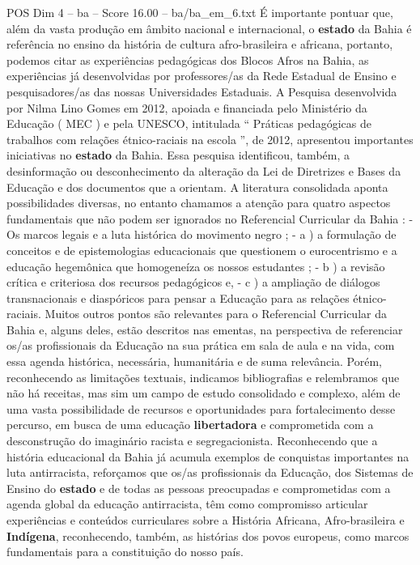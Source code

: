 \begin{textsample}{POS Dim 4 – ba – Score 16.00 – ba/ba\_em\_6.txt}
É importante pontuar que, além da vasta produção em âmbito nacional e internacional, o \textbf{estado} da Bahia é referência no ensino da história de cultura afro-brasileira e africana, portanto, podemos citar as experiências pedagógicas dos Blocos Afros na Bahia, as experiências já desenvolvidas por professores/as da Rede Estadual de Ensino e pesquisadores/as das nossas Universidades Estaduais.
A Pesquisa desenvolvida por Nilma Lino Gomes em 2012, apoiada e financiada pelo Ministério da Educação ( MEC ) e pela UNESCO, intitulada “ Práticas pedagógicas de trabalhos com relações étnico-raciais na escola ”, de 2012, apresentou importantes iniciativas no \textbf{estado} da Bahia.
Essa pesquisa identificou, também, a desinformação ou desconhecimento da alteração da Lei de Diretrizes e Bases da Educação e dos documentos que a orientam.
A literatura consolidada aponta possibilidades diversas, no entanto chamamos a atenção para quatro aspectos fundamentais que não podem ser ignorados no Referencial Curricular da Bahia : - Os marcos legais e a luta histórica do movimento negro ; - a ) a formulação de conceitos e de epistemologias educacionais que questionem o eurocentrismo e a educação hegemônica que homogeneíza os nossos estudantes ; - b ) a revisão crítica e criteriosa dos recursos pedagógicos e, - c ) a ampliação de diálogos transnacionais e diaspóricos para pensar a Educação para as relações étnico-raciais.
Muitos outros pontos são relevantes para o Referencial Curricular da Bahia e, alguns deles, estão descritos nas ementas, na perspectiva de referenciar os/as profissionais da Educação na sua prática em sala de aula e na vida, com essa agenda histórica, necessária, humanitária e de suma relevância.
Porém, reconhecendo as limitações textuais, indicamos bibliografias e relembramos que não há receitas, mas sim um campo de estudo consolidado e complexo, além de uma vasta possibilidade de recursos e oportunidades para fortalecimento desse percurso, em busca de uma educação \textbf{libertadora} e comprometida com a desconstrução do imaginário racista e segregacionista.
Reconhecendo que a história educacional da Bahia já acumula exemplos de conquistas importantes na luta antirracista, reforçamos que os/as profissionais da Educação, dos Sistemas de Ensino do \textbf{estado} e de todas as pessoas preocupadas e comprometidas com a agenda global da educação antirracista, têm como compromisso articular experiências e conteúdos curriculares sobre a História Africana, Afro-brasileira e \textbf{Indígena}, reconhecendo, também, as histórias dos povos europeus, como marcos fundamentais para a constituição do nosso país.

\end{textsample}
